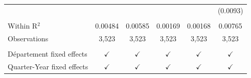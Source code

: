 \begin{table}[htbp]
{\begin{tabular}{lccccc}
                                                        &               &               &               &               & (0.0093)\\   
       \\
      Within R$^2$                                      & 0.00484       & 0.00585       & 0.00169       & 0.00168       & 0.00765\\  
      Observations                                      & 3,523         & 3,523         & 3,523         & 3,523         & 3,523\\  
       \\
      Département fixed effects                         & $\checkmark$  & $\checkmark$  & $\checkmark$  & $\checkmark$  & $\checkmark$\\   
      Quarter-Year fixed effects                        & $\checkmark$  & $\checkmark$  & $\checkmark$  & $\checkmark$  & $\checkmark$\\   
      \bottomrule
   \end{tabular}%
   }
\end{table}


